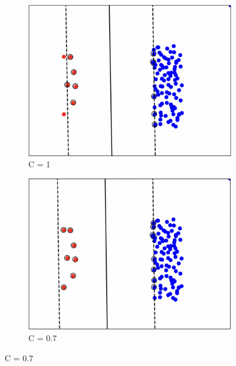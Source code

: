 \documentclass[a4paper,12pt]{article}
\begin{document}
\begin{figure}[H]
    \centering
    \begin{subfigure}[b]{0.45\textwidth}
        \centering
        \includegraphics[width=\textwidth]{Images/C=1.png}
        \caption{C = 1}
        \label{}
    \end{subfigure}
    \hfill
    \begin{subfigure}[b]{0.45\textwidth}
        \centering
        \includegraphics[width=\textwidth]{Images/C=0.7.png}
        \caption{C = 0.7}
        \label{}
    \end{subfigure}


\end{figure}
\end{document}
